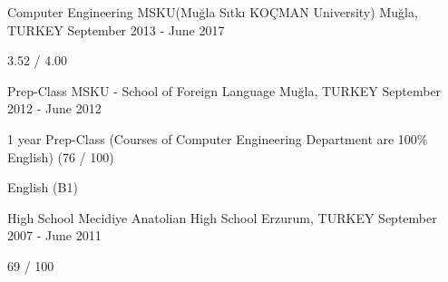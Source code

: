 \begin{cventries}
    \cventry
        {Computer Engineering}
        {MSKU(Muğla Sıtkı KOÇMAN University)}
        {Muğla, TURKEY}
        {September 2013 - June 2017}
        {
            \begin {cvitems}
                \item {3.52 / 4.00}
            \end {cvitems}
        }

    \cventry
        {Prep-Class}
        {MSKU - School of Foreign Language }
        {Muğla, TURKEY}
        {September 2012 - June 2012}
        {
            \begin {cvitems}
                \item {1 year Prep-Class (Courses of Computer Engineering Department are 100\% English) (76 / 100)}
                \item {English (B1)}
            \end {cvitems}
        }
    \cventry
        {High School}
        {Mecidiye Anatolian High School}
        {Erzurum, TURKEY}
        {September 2007 - June 2011}
        {
            \begin {cvitems}
                \item {69 / 100}
            \end {cvitems}
        }

\end{cventries}
